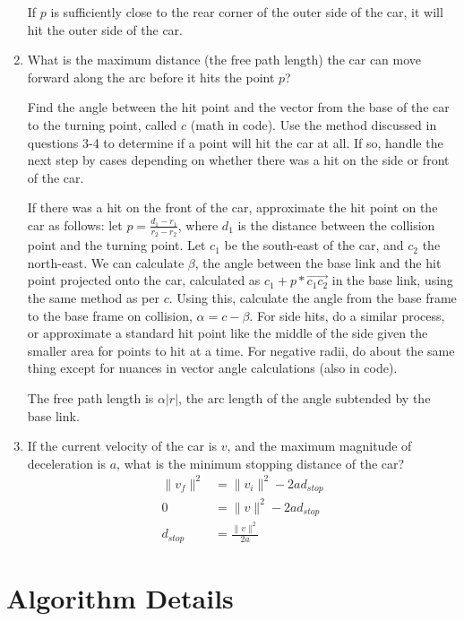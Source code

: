 \documentclass[11pt]{article}
\begin{document}
\begin{enumerate}[leftmargin=*]
    If $p$ is sufficiently close to the rear corner of the outer side of the
    car, it will hit the outer side of the car.


    \item
    What is the maximum distance (the free path length) the car can move forward
    along the arc before it hits the point $p$?
    
    Find the angle between the hit point and the vector from the base of the car to the turning point, called $c$ (math in code). Use the method discussed in questions 3-4 to determine if a point will hit the car at all. If so, handle the next step by cases depending on whether there was a hit on the side or front of the car. 
    
    If there was a hit on the front of the car, approximate the hit point on the car as follows: let $p = \frac{d_1 - r_1}{r_2 - r_2}$, where $d_1$ is the distance between the collision point and the turning point. Let $c_1$ be the south-east of the car, and $c_2$ the north-east. We can calculate $\beta$, the angle between the base link and the hit point projected onto the car, calculated as $c_1 + p * \vec{c_1 c_2}$  in the base link, using the same method as per $c$. Using this, calculate the angle from the base frame to the base frame on collision, $\alpha = c - \beta$.     For side hits, do a similar process, or approximate a standard hit point like the middle of the side given the smaller area for points to hit at a time. For negative radii, do about the same thing except for nuances in vector angle calculations (also in code). 
    
    The free path length is $\alpha \lvert r \rvert$, the arc length of the
    angle subtended by the base link.

    \item
    If the current velocity of the car is $v$, and the maximum magnitude of
    deceleration is $a$, what is the minimum stopping distance of the car?
    \begin{align*}
        \lVert v_f \rVert^2 &= \lVert v_i \rVert^2 - 2ad_{stop} \\
        0 &= \lVert v \rVert^2 - 2 a d_{stop} \\
        d_{stop} &= \frac{\lVert v \rVert^2}{2a}
    \end{align*}
\end{enumerate}

\section{Algorithm Details}
\end{document}
